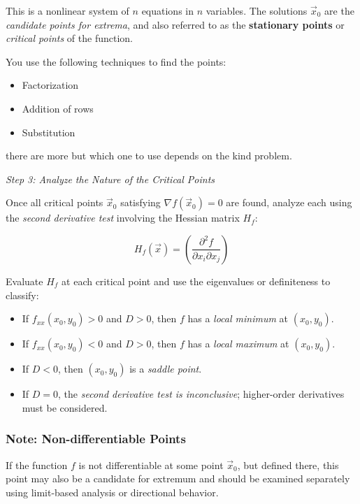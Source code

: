 This is a nonlinear system of \( n \) equations in \( n \) variables. The solutions \( \vec{x}_0 \) 
are the \emph{candidate points for extrema}, and also referred to as the 
\textbf{stationary points} or \emph{critical points} of the function.
\vspace{\baselineskip}

You use the following techniques to find the points: 
\begin{itemize}[label=\(-\)]
    \item Factorization
    \item Addition of rows
    \item Substitution
\end{itemize}

there are more but which one to use depends on the kind problem.

\emph{Step 3: Analyze the Nature of the Critical Points}

Once all critical points \( \vec{x}_0 \) satisfying \( \nabla f(\vec{x}_0) = 0 \) are found, analyze each using
 the \emph{second derivative test} involving the Hessian matrix \( H_f \):

\[
H_f(\vec{x}) = \left( \frac{\partial^2 f}{\partial x_i \partial x_j} \right)
\]

Evaluate \( H_f \) at each critical point and use the eigenvalues or definiteness to classify:

\begin{itemize}[label=\(-\)]
    \item If \( f_{xx}(x_0, y_0) > 0 \) and \( D > 0 \), then \( f \) has a \emph{local minimum} at \( (x_0, y_0) \).
    \item If \( f_{xx}(x_0, y_0) < 0 \) and \( D > 0 \), then \( f \) has a \emph{local maximum} at \( (x_0, y_0) \).
    \item If \( D < 0 \), then \( (x_0, y_0) \) is a \emph{saddle point}.
    \item If \( D = 0 \), the \emph{second derivative test is inconclusive}; higher-order derivatives must be considered.
\end{itemize}

\subsubsection{Note: Non-differentiable Points}

If the function \( f \) is not differentiable at some point \( \vec{x}_0 \), but defined there, this point may also be a 
candidate for extremum and should be examined separately using limit-based analysis or directional behavior.

